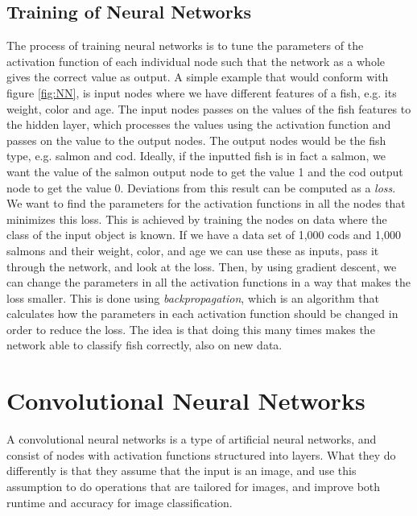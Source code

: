 \newpage

\subsection{Training of Neural Networks}
\label{sec:training}
The process of training neural networks is to tune the parameters of the activation function of each individual node such that the network as a whole gives the correct value as output. A simple example that would conform with figure \ref{fig:NN}, is input nodes where we have different features of a fish, e.g. its weight, color and age. The input nodes passes on the values of the fish features to the hidden layer, which processes the values using the activation function and passes on the value to the output nodes. The output nodes would be the fish type, e.g. salmon and cod. Ideally, if the inputted fish is in fact a salmon, we want the value of the salmon output node to get the value 1 and the cod output node to get the value 0. Deviations from this result can be computed as a \textit{loss}. We want to find the parameters for the activation functions in all the nodes that minimizes this loss. This is achieved by training the nodes on data where the class of the input object is known. If we have a data set of 1,000 cods and 1,000 salmons and their weight, color, and age we can use these as inputs, pass it through the network, and look at the loss. Then, by using gradient descent, we can change the parameters in all the activation functions in a way that makes the loss smaller. This is done using \textit{backpropagation}, which is an algorithm that calculates how the parameters in each activation function should be changed in order to reduce the loss. The idea is that doing this many times makes the network able to classify fish correctly, also on new data. 


\section{Convolutional Neural Networks}

A convolutional neural networks is a type of artificial neural networks, and consist of nodes with activation functions structured into layers. What they do differently is that they assume that the input is an image, and use this assumption to do operations that are tailored for images, and improve both runtime and accuracy for image classification. 

